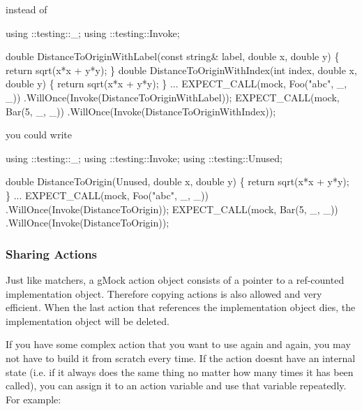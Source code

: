 instead of


\begin{DoxyCode}
using ::testing::\_;
using ::testing::Invoke;

\textcolor{keywordtype}{double} DistanceToOriginWithLabel(\textcolor{keyword}{const} \textcolor{keywordtype}{string}& label, \textcolor{keywordtype}{double} x, \textcolor{keywordtype}{double} y) \{
  \textcolor{keywordflow}{return} sqrt(x*x + y*y);
\}
\textcolor{keywordtype}{double} DistanceToOriginWithIndex(\textcolor{keywordtype}{int} index, \textcolor{keywordtype}{double} x, \textcolor{keywordtype}{double} y) \{
  \textcolor{keywordflow}{return} sqrt(x*x + y*y);
\}
...
  EXPECT\_CALL(mock, Foo(\textcolor{stringliteral}{"abc"}, \_, \_))
      .WillOnce(Invoke(DistanceToOriginWithLabel));
  EXPECT\_CALL(mock, Bar(5, \_, \_))
      .WillOnce(Invoke(DistanceToOriginWithIndex));
\end{DoxyCode}


you could write


\begin{DoxyCode}
using ::testing::\_;
using ::testing::Invoke;
using ::testing::Unused;

\textcolor{keywordtype}{double} DistanceToOrigin(Unused, \textcolor{keywordtype}{double} x, \textcolor{keywordtype}{double} y) \{
  \textcolor{keywordflow}{return} sqrt(x*x + y*y);
\}
...
  EXPECT\_CALL(mock, Foo(\textcolor{stringliteral}{"abc"}, \_, \_))
      .WillOnce(Invoke(DistanceToOrigin));
  EXPECT\_CALL(mock, Bar(5, \_, \_))
      .WillOnce(Invoke(DistanceToOrigin));
\end{DoxyCode}


\subsubsection*{Sharing Actions}

Just like matchers, a g\+Mock action object consists of a pointer to a ref-\/counted implementation object. Therefore copying actions is also allowed and very efficient. When the last action that references the implementation object dies, the implementation object will be deleted.

If you have some complex action that you want to use again and again, you may not have to build it from scratch every time. If the action doesn\textquotesingle{}t have an internal state (i.\+e. if it always does the same thing no matter how many times it has been called), you can assign it to an action variable and use that variable repeatedly. For example\+:


